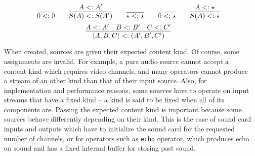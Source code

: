 \begin{figure}[t]
\[
   \infer{0\sub 0}{} \quad\quad
   \infer{S(A)\sub S(A')}{A\sub A'} \quad\quad
   \infer{\star\sub\star}{} \quad\quad
   \infer{0\sub \star}{} \quad\quad
   \infer{S(A)\sub \star}{A\sub\star}
\]\[
   \infer{(A,B,C) \sub (A',B',C')}{A \sub A' & B\sub B' & C\sub C'}
\]
 \label{fig:subtyping}
\end{figure}

When created, sources are given their expected content kind.
Of course, some assignments are invalid.
For example,
a pure audio source cannot accept a content kind which requires video 
channels, and many operators cannot produce a stream of an other kind
than that of their input source.
Also, for implementation and performance reasons, some sources have
to operate on input streams that have a fixed kind --
a kind is said to be fixed when all of its components are.
Passing the expected content kind is important because some sources
behave differently depending on their kind.
This is the case
of sound card inputs and outputs which have to initialize the sound card for the
requested number of channels, or for operators such as \texttt{echo} operator,
which produces echo on sound and has a fixed internal buffer for storing past
sound.

